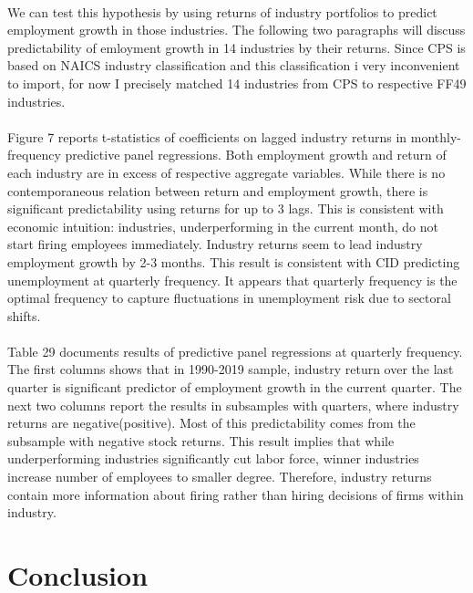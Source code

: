 \documentclass[12pt]{article}
\begin{document}
\paragraph{}
We can test this hypothesis by using returns of industry portfolios to predict employment growth in those industries. The following two paragraphs will discuss predictability of emloyment growth in 14 industries by their returns. Since CPS is based on NAICS industry classification and this classification i very inconvenient to import, for now I precisely matched 14 industries from CPS to respective FF49 industries.
\paragraph{}
Figure 7 reports t-statistics of coefficients on lagged industry returns in monthly-frequency predictive panel regressions. Both employment growth and return of each industry are in excess of respective aggregate variables. While there is no contemporaneous relation between return and employment growth, there is significant predictability using returns for up to 3 lags. This is consistent with economic intuition: industries, underperforming in the current month, do not start firing employees immediately. Industry returns seem to lead industry employment growth by 2-3 months. This result is consistent with CID predicting unemployment at quarterly frequency. It appears that quarterly frequency is the optimal frequency to capture fluctuations in unemployment risk due to sectoral shifts.
\paragraph{}
Table 29 documents results of predictive panel regressions at quarterly frequency. The first columns shows that in 1990-2019 sample, industry return over the last quarter is significant predictor of employment growth in the current quarter. The next two columns report the results in subsamples with quarters, where industry returns are negative(positive). Most of this predictability comes from the subsample with negative stock returns. This result implies that while underperforming industries significantly cut labor force, winner industries increase number of employees to smaller degree. Therefore, industry returns contain more information about firing rather than hiring decisions of firms within industry.


\vspace{1cm}

\section{Conclusion} \label{sec:Model}
\end{document}

